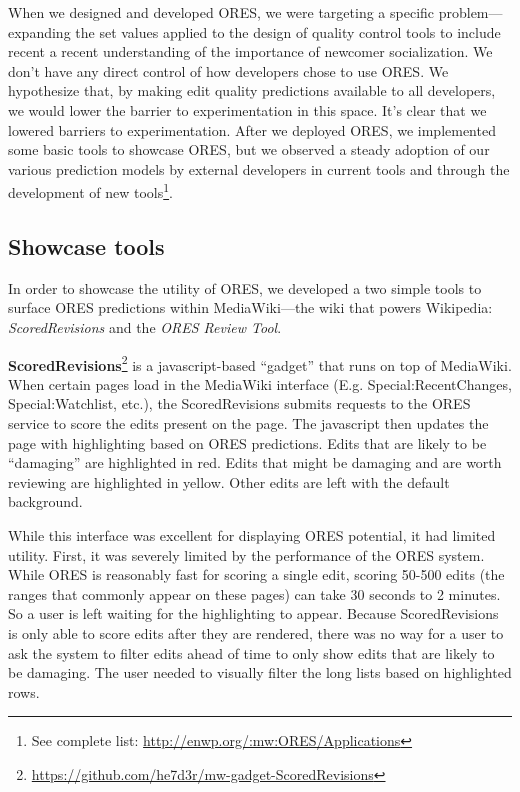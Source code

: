 When we designed and developed ORES, we were targeting a specific problem---expanding the set values applied to the design of quality control tools to include recent a recent understanding of the importance of newcomer socialization.  We don't have any direct control of how developers chose to use ORES.  We hypothesize that, by making edit quality predictions available to all developers, we would lower the barrier to experimentation in this space.  It's clear that we lowered barriers to experimentation.  After we deployed ORES, we implemented some basic tools to showcase ORES, but we observed a steady adoption of our various prediction models by external developers in current tools and through the development of new tools\footnote{See complete list: \url{http://enwp.org/:mw:ORES/Applications}}.

\subsection{Showcase tools}
In order to showcase the utility of ORES, we developed a two simple tools to surface ORES predictions within MediaWiki---the wiki that powers Wikipedia: \emph{ScoredRevisions} and the \emph{ORES Review Tool}.

\textbf{ScoredRevisions}\footnote{\url{https://github.com/he7d3r/mw-gadget-ScoredRevisions}} is a javascript-based ``gadget'' that runs on top of MediaWiki.  When certain pages load in the MediaWiki interface (E.g. Special:RecentChanges, Special:Watchlist, etc.), the ScoredRevisions submits requests to the ORES service to score the edits present on the page.  The javascript then updates the page with highlighting based on ORES predictions.  Edits that are likely to be ``damaging'' are highlighted in red.  Edits that might be damaging and are worth reviewing are highlighted in yellow.  Other edits are left with the default background.

While this interface was excellent for displaying ORES potential, it had limited utility.  First, it was severely limited by the performance of the ORES system.  While ORES is reasonably fast for scoring a single edit, scoring 50-500 edits (the ranges that commonly appear on these pages) can take 30 seconds to 2 minutes.  So a user is left waiting for the highlighting to appear.  Because ScoredRevisions is only able to score edits after they are rendered, there was no way for a user to ask the system to filter edits ahead of time to only show edits that are likely to be damaging.  The user needed to visually filter the long lists based on highlighted rows.

